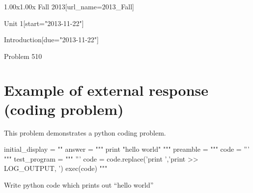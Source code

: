 \documentclass[12pt]{article}
\begin{document}
\begin{edXcourse}{1.00x}{1.00x Fall 2013}[url_name=2013_Fall]
\begin{edXchapter}{Unit 1}[start="2013-11-22"]
\begin{edXsection}{Introduction}[due="2013-11-22"]
\begin{edXproblem}{Problem 5}{10}
\section{Example of external response (coding problem)}  

This problem demonstrates a python coding problem.

\begin{edXscript}
initial_display = ""
answer = """
print "hello world"
"""
preamble = """ 
code = '''
"""
test_program = """
'''
code = code.replace('print ','print >> LOG_OUTPUT, ')
exec(code)
"""
\end{edXscript}

Write python code which prints out ``hello world''


\end{edXproblem}


\end{edXsection}
\end{edXchapter}
\end{edXcourse}

\end{document}
